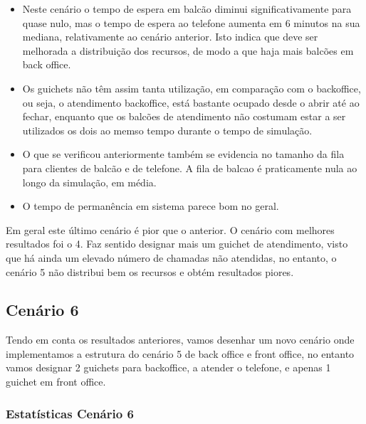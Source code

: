 \documentclass[
]{article}
\providecommand{\tightlist}{%
  \setlength{\itemsep}{0pt}\setlength{\parskip}{0pt}}
\begin{document}
\begin{itemize}
\tightlist
\item
  Neste cenário o tempo de espera em balcão diminui significativamente
  para quase nulo, mas o tempo de espera ao telefone aumenta em 6
  minutos na sua mediana, relativamente ao cenário anterior. Isto indica
  que deve ser melhorada a distribuição dos recursos, de modo a que haja
  mais balcões em back office.
\item
  Os guichets não têm assim tanta utilização, em comparação com o
  backoffice, ou seja, o atendimento backoffice, está bastante ocupado
  desde o abrir até ao fechar, enquanto que os balcões de atendimento
  não costumam estar a ser utilizados os dois ao memso tempo durante o
  tempo de simulação.
\item
  O que se verificou anteriormente também se evidencia no tamanho da
  fila para clientes de balcão e de telefone. A fila de balcao é
  praticamente nula ao longo da simulação, em média.
\item
  O tempo de permanência em sistema parece bom no geral.
\end{itemize}

Em geral este último cenário é pior que o anterior. O cenário com
melhores resultados foi o 4. Faz sentido designar mais um guichet de
atendimento, visto que há ainda um elevado número de chamadas não
atendidas, no entanto, o cenário 5 não distribui bem os recursos e obtém
resultados piores.

\subsection{Cenário 6}\label{cenuxe1rio-6}

Tendo em conta os resultados anteriores, vamos desenhar um novo cenário
onde implementamos a estrutura do cenário 5 de back office e front
office, no entanto vamos designar 2 guichets para backoffice, a atender
o telefone, e apenas 1 guichet em front office.

\subsubsection{Estatísticas Cenário
6}\label{estatuxedsticas-cenuxe1rio-6}
\end{document}
